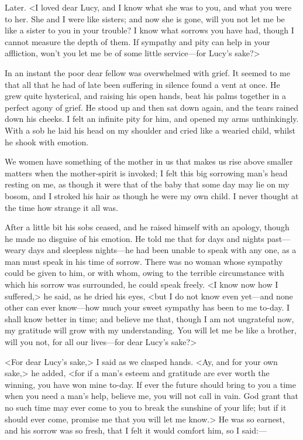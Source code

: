 \begin{diary}{Later.}
<I loved dear Lucy, and I know what she was to you, and what you were to her. She and I were like sisters; and now she is gone, will you not let me be like a sister to you in your trouble? I know what sorrows you have had, though I cannot measure the depth of them. If sympathy and pity can help in your affliction, won't you let me be of some little service—for Lucy's sake?>

In an instant the poor dear fellow was overwhelmed with grief. It seemed to me that all that he had of late been suffering in silence found a vent at once. He grew quite hysterical, and raising his open hands, beat his palms together in a perfect agony of grief. He stood up and then sat down again, and the tears rained down his cheeks. I felt an infinite pity for him, and opened my arms unthinkingly. With a sob he laid his head on my shoulder and cried like a wearied child, whilst he shook with emotion.

We women have something of the mother in us that makes us rise above smaller matters when the mother-spirit is invoked; I felt this big sorrowing man's head resting on me, as though it were that of the baby that some day may lie on my bosom, and I stroked his hair as though he were my own child. I never thought at the time how strange it all was.

After a little bit his sobs ceased, and he raised himself with an apology, though he made no disguise of his emotion. He told me that for days and nights past—weary days and sleepless nights—he had been unable to speak with any one, as a man must speak in his time of sorrow. There was no woman whose sympathy could be given to him, or with whom, owing to the terrible circumstance with which his sorrow was surrounded, he could speak freely. <I know now how I suffered,> he said, as he dried his eyes, <but I do not know even yet—and none other can ever know—how much your sweet sympathy has been to me to-day. I shall know better in time; and believe me that, though I am not ungrateful now, my gratitude will grow with my understanding. You will let me be like a brother, will you not, for all our lives—for dear Lucy's sake?>

<For dear Lucy's sake,> I said as we clasped hands. <Ay, and for your own sake,> he added, <for if a man's esteem and gratitude are ever worth the winning, you have won mine to-day. If ever the future should bring to you a time when you need a man's help, believe me, you will not call in vain. God grant that no such time may ever come to you to break the sunshine of your life; but if it should ever come, promise me that you will let me know.> He was so earnest, and his sorrow was so fresh, that I felt it would comfort him, so I said:—


\end{diary}
